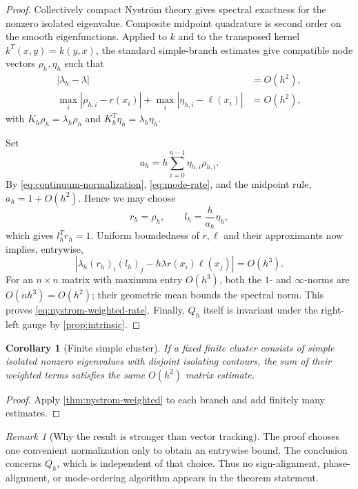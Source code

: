 \documentclass[11pt]{article}
\newtheorem{corollary}[theorem]{Corollary}
\theoremstyle{definition}
\theoremstyle{remark}
\newtheorem{remark}[theorem]{Remark}
\begin{document}
\begin{proof}
Collectively compact Nystr\"om theory gives spectral exactness for the
nonzero isolated eigenvalue.  Composite midpoint quadrature is second order
on the smooth eigenfunctions.  Applied to $k$ and to the transposed kernel
$k^T(x,y)=k(y,x)$, the standard simple-branch estimates
\citep{Atkinson1967,Anselone1971,Atkinson1997,Chatelin1983} give compatible
node vectors $\rho_h,\eta_h$ such that
\begin{align}
 |\lambda_h-\lambda|&=O(h^2),\label{eq:eigenvalue-rate}\\
 \max_i|\rho_{h,i}-r(x_i)|
 +\max_i|\eta_{h,i}-\ell(x_i)|&=O(h^2),
 \label{eq:mode-rate}
\end{align}
with $K_h\rho_h=\lambda_h\rho_h$ and
$K_h^T\eta_h=\lambda_h\eta_h$.

Set
\[
 a_h=h\sum_{i=0}^{n-1}\eta_{h,i}\rho_{h,i}.
\]
By \eqref{eq:continuum-normalization}, \eqref{eq:mode-rate}, and the midpoint
rule, $a_h=1+O(h^2)$.  Hence we may choose
\[
 r_h=\rho_h,\qquad l_h=\frac{h}{a_h}\eta_h,
\]
which gives $l_h^Tr_h=1$.  Uniform boundedness of $r,\ell$ and their
approximants now implies, entrywise,
\[
 \left|
 \lambda_h(r_h)_i(l_h)_j
 -h\lambda r(x_i)\ell(x_j)
 \right|=O(h^3).
\]
For an $n\times n$ matrix with maximum entry $O(h^3)$, both the $1$- and
$\infty$-norms are $O(nh^3)=O(h^2)$; their geometric mean bounds the
spectral norm.  This proves \eqref{eq:nystrom-weighted-rate}.  Finally,
$Q_h$ itself is invariant under the right-left gauge by
\cref{prop:intrinsic}.
\end{proof}

\begin{corollary}[Finite simple cluster]
\label{cor:simple-cluster}
If a fixed finite cluster consists of simple isolated nonzero eigenvalues
with disjoint isolating contours, the sum of their weighted terms satisfies
the same $O(h^2)$ matrix estimate.
\end{corollary}

\begin{proof}
Apply \cref{thm:nystrom-weighted} to each branch and add finitely many
estimates.
\end{proof}

\begin{remark}[Why the result is stronger than vector tracking]
The proof chooses one convenient normalization only to obtain an entrywise
bound.  The conclusion concerns $Q_h$, which is independent of that choice.
Thus no sign-alignment, phase-alignment, or mode-ordering algorithm appears
in the theorem statement.
\end{remark}
\end{document}

